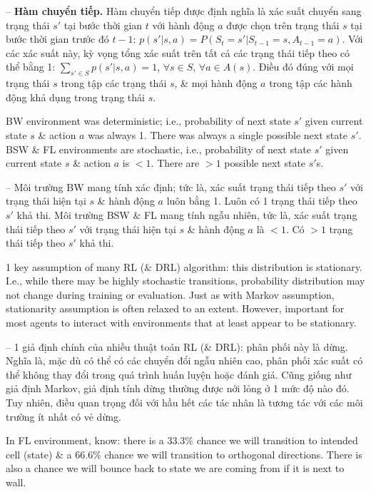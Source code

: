 \documentclass{article}
\begin{document}
\begin{itemize}
\begin{itemize}
        -- {\bf Hàm chuyển tiếp.} Hàm chuyển tiếp được định nghĩa là xác suất chuyển sang trạng thái $s'$ tại bước thời gian $t$ với hành động $a$ được chọn trên trạng thái $s$ tại bước thời gian trước đó $t - 1$: $p(s'|s,a) = P(S_t = s'|S_{t-1} = s,A_{t-1} = a)$. Với các xác suất này, kỳ vọng tổng xác suất trên tất cả các trạng thái tiếp theo có thể bằng 1: $\sum_{s'\in S} p(s'|s,a) = 1$, $\forall s\in S$, $\forall a\in A(s)$. Điều đó đúng với mọi trạng thái $s$ trong tập các trạng thái $s$, \& mọi hành động $a$ trong tập các hành động khả dụng trong trạng thái $s$.

        BW environment was deterministic; i.e., probability of next state $s'$ given current state $s$ \& action $a$ was always 1. There was always a single possible next state $s'$. BSW \& FL environments are stochastic, i.e., probability of next state $s'$ given current state $s$ \& action $a$ is $< 1$. There are $> 1$ possible next state $s'$s.

        -- Môi trường BW mang tính xác định; tức là, xác suất trạng thái tiếp theo $s'$ với trạng thái hiện tại $s$ \& hành động $a$ luôn bằng 1. Luôn có 1 trạng thái tiếp theo $s'$ khả thi. Môi trường BSW \& FL mang tính ngẫu nhiên, tức là, xác suất trạng thái tiếp theo $s'$ với trạng thái hiện tại $s$ \& hành động $a$ là $< 1$. Có $> 1$ trạng thái tiếp theo $s'$ khả thi.

        1 key assumption of many RL  (\& DRL) algorithm: this distribution is stationary. I.e., while there may be highly stochastic transitions, probability distribution may not change during training or evaluation. Just as with Markov assumption, stationarity assumption is often relaxed to an extent. However, important for most agents to interact with environments that at least appear to be stationary.

        -- 1 giả định chính của nhiều thuật toán RL (\& DRL): phân phối này là dừng. Nghĩa là, mặc dù có thể có các chuyển đổi ngẫu nhiên cao, phân phối xác suất có thể không thay đổi trong quá trình huấn luyện hoặc đánh giá. Cũng giống như giả định Markov, giả định tính dừng thường được nới lỏng ở 1 mức độ nào đó. Tuy nhiên, điều quan trọng đối với hầu hết các tác nhân là tương tác với các môi trường ít nhất có vẻ dừng.

        In FL environment, know: there is a 33.3\% chance we will transition to intended cell (state) \& a 66.6\% chance we will transition to orthogonal directions. There is also a chance we will bounce back to state we are coming from if it is next to wall.


\end{itemize}
\end{itemize}
\end{document}
